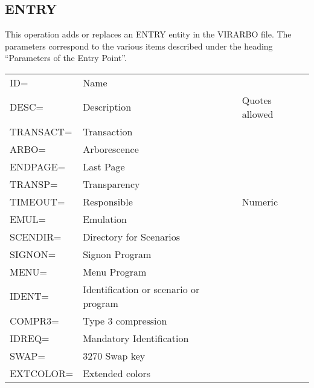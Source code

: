 \documentclass[letterpaper,10pt,english]{sphinxmanual}
\begin{document}

\subsection{ENTRY}
\label{\detokenize{Installation_Guide:entry}}\label{\detokenize{Installation_Guide:index-29}}
This operation adds or replaces an ENTRY entity in the VIRARBO file. The parameters correspond to the various items
described under the heading “Parameters of the Entry Point”.


\begin{savenotes}\sphinxattablestart
\centering
\begin{tabulary}{\linewidth}[t]{|T|T|T|}
\hline
{}\relax &\relax &\relax \\
\hline
ID=
&
Name
&\\
\hline
DESC=
&
Description
&
Quotes allowed
\\
\hline
TRANSACT=
&
Transaction
&\\
\hline
ARBO=
&
Arborescence
&\\
\hline
ENDPAGE=
&
Last Page
&\\
\hline
TRANSP=
&
Transparency
&\\
\hline
TIMEOUT=
&
Responsible
&
Numeric
\\
\hline
EMUL=
&
Emulation
&\\
\hline
SCENDIR=
&
Directory for
Scenarios
&\\
\hline
SIGNON=
&
Signon Program
&\\
\hline
MENU=
&
Menu Program
&\\
\hline
IDENT=
&
Identification or
scenario or program
&\\
\hline
COMPR3=
&
Type 3 compression
&\\
\hline
IDREQ=
&
Mandatory
Identification
&\\
\hline
SWAP=
&
3270 Swap key
&\\
\hline
EXTCOLOR=
&
Extended colors
&\\
\hline
\end{tabulary}
\par
\sphinxattableend\end{savenotes}

\end{document}
